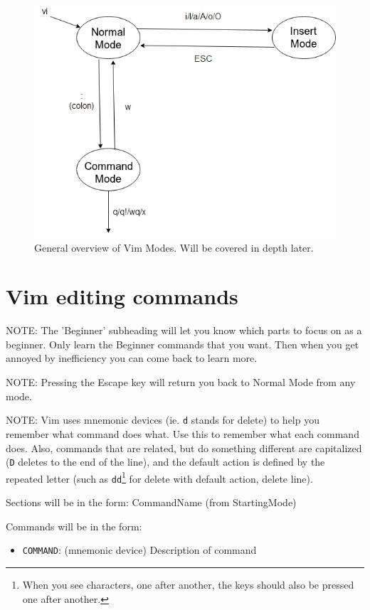 \documentclass[11pt]{article}
\begin{document}
\begin{figure}[htbp]
\centering
\includegraphics[width=.9\linewidth]{./modes.jpg}
\caption{\label{fig:org7bb5c59}
General overview of Vim Modes. Will be covered in depth later.}
\end{figure}
\section{Vim editing commands}
\label{sec:org050b61a}
NOTE: The 'Beginner' subheading will let you know which parts to focus on as a
beginner. Only learn the Beginner commands that you want. Then when you get
annoyed by inefficiency you can come back to learn more.

NOTE: Pressing the Escape key will return you back to Normal Mode from any mode.

NOTE: Vim uses mnemonic devices (ie. \texttt{d} stands for delete) to help you remember
what command does what. Use this to remember what each command does. Also,
commands that are related, but do something different are capitalized (\texttt{D}
deletes to the end of the line), and the default action is defined by the
repeated letter (such as \texttt{dd}\footnote{When you see characters, one after another, the keys should also be pressed
one after another.} for delete with default action, delete line).

Sections will be in the form: CommandName (from StartingMode)

Commands will be in the form:
\begin{itemize}
\item \texttt{COMMAND}: (mnemonic device) Description of command
\end{itemize}
\end{document}
